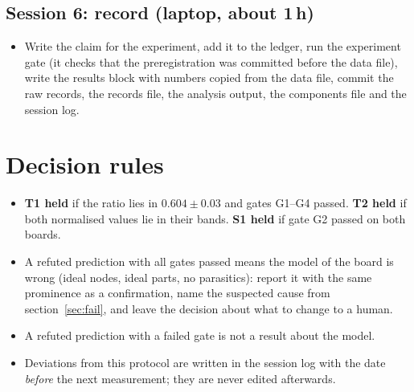 \documentclass[11pt,a4paper]{article}
\newcommand{\chk}{$\square$\ }
\begin{document}
\subsection*{Session 6: record (laptop, about 1\,h)}
\begin{itemize}
\item[\chk] Write the claim for the experiment, add it to the ledger, run the experiment gate (it checks that the preregistration was committed before the data file), write the results block with numbers copied from the data file, commit the raw records, the records file, the analysis output, the components file and the session log.
\end{itemize}

\section{Decision rules}
\begin{itemize}
\item \textbf{T1 held} if the ratio lies in $0.604\pm0.03$ and gates G1--G4 passed. \textbf{T2 held} if both normalised values lie in their bands. \textbf{S1 held} if gate G2 passed on both boards.
\item A refuted prediction with all gates passed means the model of the board is wrong (ideal nodes, ideal parts, no parasitics): report it with the same prominence as a confirmation, name the suspected cause from section~\ref{sec:fail}, and leave the decision about what to change to a human.
\item A refuted prediction with a failed gate is not a result about the model.
\item Deviations from this protocol are written in the session log with the date \emph{before} the next measurement; they are never edited afterwards.
\end{itemize}
\end{document}
